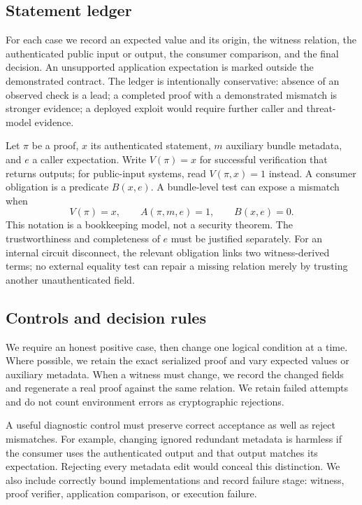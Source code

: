 \documentclass[sigconf,nonacm]{acmart}
\begin{document}
\subsection{Statement ledger}
For each case we record an expected value and its origin, the witness relation, the authenticated public input or output, the consumer comparison, and the final decision. An unsupported application expectation is marked outside the demonstrated contract. The ledger is intentionally conservative: absence of an observed check is a lead; a completed proof with a demonstrated mismatch is stronger evidence; a deployed exploit would require further caller and threat-model evidence.

Let $\pi$ be a proof, $x$ its authenticated statement, $m$ auxiliary bundle metadata, and $e$ a caller expectation. Write $V(\pi)=x$ for successful verification that returns outputs; for public-input systems, read $V(\pi,x)=1$ instead. A consumer obligation is a predicate $B(x,e)$. A bundle-level test can expose a mismatch when
\begin{equation}
 V(\pi)=x,\qquad A(\pi,m,e)=1,\qquad B(x,e)=0.
\end{equation}
This notation is a bookkeeping model, not a security theorem. The trustworthiness and completeness of $e$ must be justified separately. For an internal circuit disconnect, the relevant obligation links two witness-derived terms; no external equality test can repair a missing relation merely by trusting another unauthenticated field.

\subsection{Controls and decision rules}
We require an honest positive case, then change one logical condition at a time. Where possible, we retain the exact serialized proof and vary expected values or auxiliary metadata. When a witness must change, we record the changed fields and regenerate a real proof against the same relation. We retain failed attempts and do not count environment errors as cryptographic rejections.

A useful diagnostic control must preserve correct acceptance as well as reject mismatches. For example, changing ignored redundant metadata is harmless if the consumer uses the authenticated output and that output matches its expectation. Rejecting every metadata edit would conceal this distinction. We also include correctly bound implementations and record failure stage: witness, proof verifier, application comparison, or execution failure.
\end{document}
